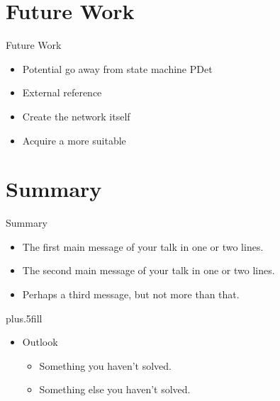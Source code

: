 \documentclass{beamer}
\begin{document}
\section*{Future Work}

\begin{frame}{Future Work}

    \begin{itemize}
        \item
            Potential go away from state machine PDet
         \item
         	External reference
         \item
         	Create the network itself
         \item
         	Acquire a more suitable
    \end{itemize}
 
\end{frame}

\section*{Summary}

\begin{frame}{Summary}

  \begin{itemize}
  \item
    The \alert{first main message} of your talk in one or two lines.
  \item
    The \alert{second main message} of your talk in one or two lines.
  \item
    Perhaps a \alert{third message}, but not more than that.
  \end{itemize}

  \vskip0pt plus.5fill
  \begin{itemize}
  \item
    Outlook
    \begin{itemize}
    \item
      Something you haven't solved.
    \item
      Something else you haven't solved.
    \end{itemize}
  \end{itemize}
\end{frame}
\end{document}
